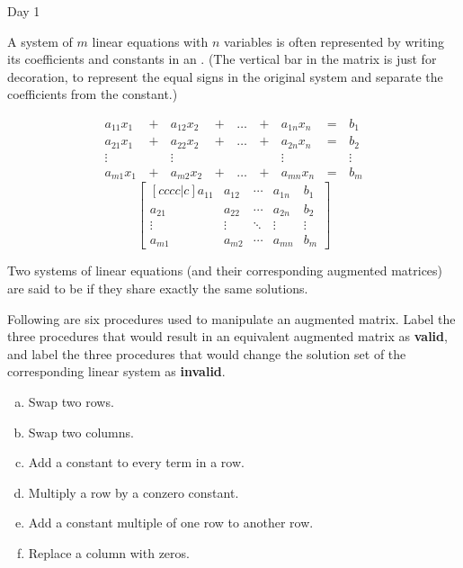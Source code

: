 \begin{applicationActivities}{Day 1}
\begin{definition}
  A system of \(m\) linear equations with \(n\) variables is often represented
  by writing its coefficients and constants in an .
  (The vertical bar in the matrix is just for decoration, to represent the
  equal signs in the original system and separate the coefficients from the
  constant.)
  \begin{multicols}{2}\noindent
  \begin{alignat*}{5}
    a_{11}x_1 &\,+\,& a_{12}x_2 &\,+\,& \dots  &\,+\,& a_{1n}x_n &\,=\,& b_1 \\
    a_{21}x_1 &\,+\,& a_{22}x_2 &\,+\,& \dots  &\,+\,& a_{2n}x_n &\,=\,& b_2 \\
     \vdots&  &\vdots&   &&  &\vdots&&\vdots  \\
    a_{m1}x_1 &\,+\,& a_{m2}x_2 &\,+\,& \dots  &\,+\,& a_{mn}x_n &\,=\,& b_m
  \end{alignat*}
  \[
    \begin{bmatrix}[cccc|c]
      a_{11} & a_{12} & \cdots & a_{1n} & b_1\\
      a_{21} & a_{22} & \cdots & a_{2n} & b_2\\
      \vdots & \vdots & \ddots & \vdots & \vdots\\
      a_{m1} & a_{m2} & \cdots & a_{mn} & b_m
    \end{bmatrix}
  \]
  \end{multicols}
\end{definition}

\begin{definition}
  Two systems of linear equations (and their corresponding augmented
  matrices) are said to be  if they share exactly the
  same solutions.
\end{definition}

\begin{activity}
  Following are six procedures used to manipulate an augmented matrix.
  Label the three procedures that would result in an equivalent augmented
  matrix as \textbf{valid}, and label the three procedures that would
  change the solution set of the corresponding linear system as
  \textbf{invalid}.
  \begin{multicols}{2}
    \begin{enumerate}[a)]
      \item Swap two rows.
      \item Swap two columns.
      \item Add a constant to every term in a row.
      \item Multiply a row by a conzero constant.
      \item Add a constant multiple of one row to another row.
      \item Replace a column with zeros.
    \end{enumerate}
  \end{multicols}
\end{activity}


\end{applicationActivities}

